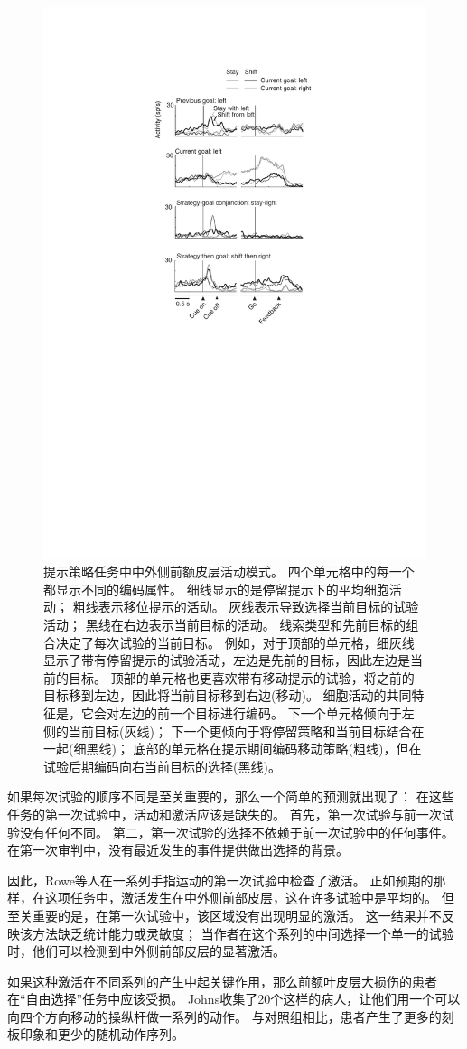 \begin{figure}
	\centering
	\includegraphics[width=0.5\linewidth]{chap6/6_11}
	\caption{提示策略任务中中外侧前额皮层活动模式。
		四个单元格中的每一个都显示不同的编码属性。
		细线显示的是停留提示下的平均细胞活动；
		粗线表示移位提示的活动。
		灰线表示导致选择当前目标的试验活动；
		黑线在右边表示当前目标的活动。
		线索类型和先前目标的组合决定了每次试验的当前目标。
		例如，对于顶部的单元格，细灰线显示了带有停留提示的试验活动，左边是先前的目标，因此左边是当前的目标。
		顶部的单元格也更喜欢带有移动提示的试验，将之前的目标移到左边，因此将当前目标移到右边(移动)。
		细胞活动的共同特征是，它会对左边的前一个目标进行编码。
		下一个单元格倾向于左侧的当前目标(灰线)；
		下一个更倾向于将停留策略和当前目标结合在一起(细黑线)；
		底部的单元格在提示期间编码移动策略(粗线)，但在试验后期编码向右当前目标的选择(黑线)\cite{tsujimoto2011comparison}。}
	\label{fig:6_11}
\end{figure}


如果每次试验的顺序不同是至关重要的，那么一个简单的预测就出现了：
在这些任务的第一次试验中，活动和激活应该是缺失的。
首先，第一次试验与前一次试验没有任何不同。
第二，第一次试验的选择不依赖于前一次试验中的任何事件。
在第一次审判中，没有最近发生的事件提供做出选择的背景。


因此，Rowe等人\cite{rowe2010action}在一系列手指运动的第一次试验中检查了激活。
正如预期的那样，在这项任务中，激活发生在中外侧前部皮层，这在许多试验中是平均的。
但至关重要的是，在第一次试验中，该区域没有出现明显的激活。
这一结果并不反映该方法缺乏统计能力或灵敏度；
当作者在这个系列的中间选择一个单一的试验时，他们可以检测到中外侧前部皮层的显著激活。


如果这种激活在不同系列的产生中起关键作用，那么前额叶皮层大损伤的患者在“自由选择”任务中应该受损。
Johns\cite{johns1996effects}收集了20个这样的病人，让他们用一个可以向四个方向移动的操纵杆做一系列的动作。
与对照组相比，患者产生了更多的刻板印象和更少的随机动作序列。


